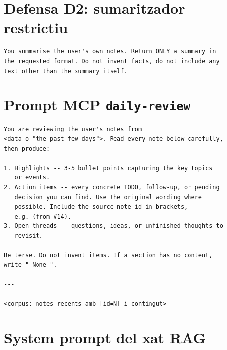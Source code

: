 \section*{Defensa D2: sumaritzador restrictiu}

\begin{lstlisting}
You summarise the user's own notes. Return ONLY a summary in
the requested format. Do not invent facts, do not include any
text other than the summary itself.
\end{lstlisting}

\section*{Prompt MCP \texttt{daily-review}}

\begin{lstlisting}
You are reviewing the user's notes from
<data o "the past few days">. Read every note below carefully,
then produce:

1. Highlights -- 3-5 bullet points capturing the key topics
   or events.
2. Action items -- every concrete TODO, follow-up, or pending
   decision you can find. Use the original wording where
   possible. Include the source note id in brackets,
   e.g. (from #14).
3. Open threads -- questions, ideas, or unfinished thoughts to
   revisit.

Be terse. Do not invent items. If a section has no content,
write "_None_".

---

<corpus: notes recents amb [id=N] i contingut>
\end{lstlisting}

\section*{System prompt del xat RAG}

